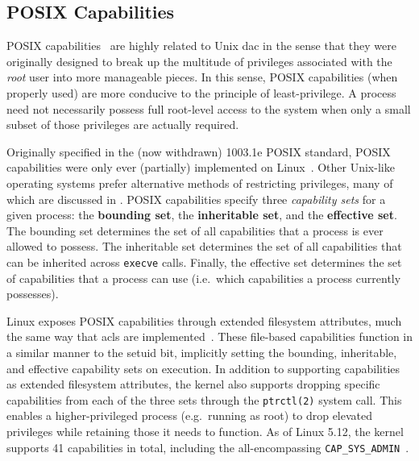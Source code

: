 
\subsection{POSIX Capabilities}

POSIX capabilities~\cite{posix_capabilities, corbet2006_capabities_a,
corbet2006_capabities_b} are highly related to Unix \gls{dac} in the sense that they were
originally designed to break up the multitude of privileges associated with the
\textit{root} user into more manageable pieces. In this sense, POSIX capabilities (when
properly used) are more conducive to the principle of least-privilege. A process need not
necessarily possess full root-level access to the system when only a small subset of those
privileges are actually required.

Originally specified in the (now withdrawn) 1003.1e POSIX standard, POSIX capabilities
were only ever (partially) implemented on Linux~\cite{anderson2017_comparison}. Other
Unix-like operating systems prefer alternative methods of restricting privileges, many of
which are discussed in . POSIX capabilities specify three
\textit{capability sets} for a given process: the \textbf{bounding set}, the
\textbf{inheritable set}, and the \textbf{effective set}. The bounding set determines the
set of all capabilities that a process is ever allowed to possess. The inheritable set
determines the set of all capabilities that can be inherited across \texttt{execve} calls.
Finally, the effective set determines the set of capabilities that a process can use
(i.e.\ which capabilities a process currently possesses).

Linux exposes POSIX capabilities through extended filesystem attributes, much the same way
that \glspl{acl} are implemented~\cite{corbet2006_capabities_b}. These file-based
capabilities function in a similar manner to the setuid bit, implicitly setting the
bounding, inheritable, and effective capability sets on execution. In addition to
supporting capabilities as extended filesystem attributes, the kernel also supports
dropping specific capabilities from each of the three sets through the \texttt{ptrctl(2)}
system call. This enables a higher-privileged process (e.g.\ running as root) to drop
elevated privileges while retaining those it needs to function. As of Linux 5.12, the
kernel supports 41 capabilities in total, including the all-encompassing
\texttt{CAP\_SYS\_ADMIN}~\cite{linux_capability_h}.

